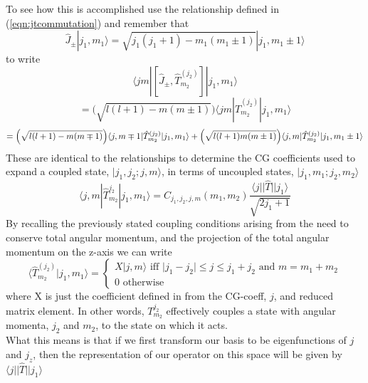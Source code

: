 \documentclass[12pt]{article}
\begin{document}
\noindent To see how this is accomplished use the relationship 
defined in (\ref{eqn:jtcommutation})
and remember that 
\begin{equation}
\hat{J}_{\pm} | j_{1},m_{1}\rangle =
 \sqrt{j_{1}(j_{1}+1) - m_{1}(m_{1}\pm 1 )} | j_{1}, m_{1}\pm1\rangle
\end{equation}
 to write
\begin{equation}
\langle j m | [\hat{J}_{\pm}, \hat{T}^{(j_{2})}_{m_{2}} ] | j_{1}, m_{1}\rangle
\end{equation}
\begin{equation}
= \Big(\sqrt{l(l+1) - m(m\pm1)}\Big)
\langle j m | \hat{T}^{(j_{2})}_{m_{2}} | j_{1}, m_{1}\rangle
\end{equation}
\begin{equation}
= 
\Big(
\sqrt{l(l+1) - m(m\mp1)}
\Big)
\langle j, m\mp 1 |
  \hat{T}^{(j_{2})}_{m_{2}}
 | j_{1}, m_{1}\rangle
+
\Big(
\sqrt{l(l+1)\- m(m\pm 1)}
\Big)
\langle j, m |
  \hat{T}^{(j_{2})}_{m_{2}}
 | j_{1}, m_{1}\pm 1\rangle
\end{equation}
These are identical to the relationships to determine the CG coefficients used to
expand a coupled state, $|j_{1},j_{2};j, m\rangle$, in terms of uncoupled states,
$|j_{1},m_{1};j_{2},m_{2}\rangle$
\begin{equation}
\langle j,m | \hat{T}^{j_{2}}_{m_{2}} | j_{1}, m_{1} \rangle 
 = C_{j_{1}, j_{2}, j,m } (m_{1}, m_{2}) 
 \frac{\langle j || \hat{T} || j_{1} \rangle}
{\sqrt{2j_{1}+1}}
\end{equation}
\noindent By recalling the previously stated coupling conditions arising from the need to conserve total angular momentum, and the projection of the total angular
momentum on the z-axis we can write
\begin{equation}
\langle \hat{T}^{(j_{2})}_{m_{2}} | j_{1}, m_{1}\rangle  =
\begin{cases}
X | j,m\rangle
\text{ \ \ \ iff  \ \ \ }
|j_{1} -j_{2}| \leq j \leq j_{1}+j_{2}
\text{ \ and  \ }
m = m_{1}+m_{2}\\
0 \text{  \ \ \ \ \ \  \ \ \  \ \ otherwise}
\end{cases}
\end{equation}
\noindent
where X is just the coefficient defined in from the CG-coeff, $j$, and reduced matrix
element. In other words, $T^{j_{2}}_{m_{2}}$ effectively couples a state with angular momenta, $j_{2}$ and  $m_{2}$, to the state on which it acts.\\

\noindent What this means is that if we first transform our basis to be eigenfunctions of
$j$ and $j_{z}$, then the representation of our operator on this space
will be given by $\langle j || \hat{T} || j_{1} \rangle$ 
\end{document}
